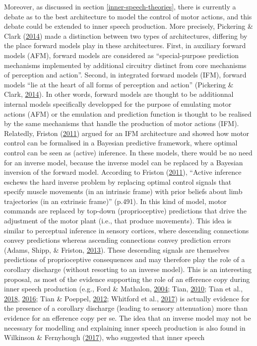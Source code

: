 \documentclass[a4paper,12pt,twoside,onecolumn,openright,final,oldfontcommands]{memoir}
\begin{document}
Moreover, as discussed in section \ref{inner-speech-theories}, there is currently a debate as to the best architecture to model the control of motor actions, and this debate could be extended to inner speech production. More precisely, Pickering \& Clark (\protect\hyperlink{ref-pickering_getting_2014}{2014}) made a distinction between two types of architectures, differing by the place forward models play in these architectures. First, in auxiliary forward models (AFM), forward models are considered as \enquote{special-purpose prediction mechanisms implemented by additional circuitry distinct from core mechanisms of perception and action}. Second, in integrated forward models (IFM), forward models \enquote{lie at the heart of all forms of perception and action} (Pickering \& Clark, \protect\hyperlink{ref-pickering_getting_2014}{2014}). In other words, forward models are thought to be additionnal internal models specifically developped for the purpose of emulating motor actions (AFM) or the emulation and prediction function is thought to be realised by the same mechanisms that handle the production of motor actions (IFM). Relatedly, Friston (\protect\hyperlink{ref-friston_what_2011}{2011}) argued for an IFM architecture and showed how motor control can be formalised in a Bayesian predictive framework, where optimal control can be seen as (active) inference. In these models, there would be no need for an inverse model, because the inverse model can be replaced by a Bayesian inversion of the forward model. According to Friston (\protect\hyperlink{ref-friston_what_2011}{2011}), \enquote{Active inference eschews the hard inverse problem by replacing optimal control signals that specify muscle movements (in an intrinsic frame) with prior beliefs about limb trajectories (in an extrinsic frame)} (p.491). In this kind of model, motor commands are replaced by top-down (proprioceptive) predictions that drive the adjustment of the motor plant (i.e., that produce movements). This idea is similar to perceptual inference in sensory cortices, where descending connections convey predictions whereas ascending connections convey prediction errors (Adams, Shipp, \& Friston, \protect\hyperlink{ref-adams_predictions_2013}{2013}). These descending signals are themselves predictions of proprioceptive consequences and may therefore play the role of a corollary discharge (without resorting to an inverse model). This is an interesting proposal, as most of the evidence supporting the role of an efference copy during inner speech production (e.g., Ford \& Mathalon, \protect\hyperlink{ref-ford_electrophysiological_2004}{2004}; Tian, \protect\hyperlink{ref-tian_mental_2010}{2010}; Tian et al., \protect\hyperlink{ref-tian_imagined_2018}{2018}, \protect\hyperlink{ref-tian_mental_2016}{2016}; Tian \& Poeppel, \protect\hyperlink{ref-tian_mental_2012}{2012}; Whitford et al., \protect\hyperlink{ref-whitford_neurophysiological_2017}{2017}) is actually evidence for the presence of a corollary discharge (leading to sensory attenuation) more than evidence for an efference copy per se. The idea that an inverse model may not be necessary for modelling and explaining inner speech production is also found in Wilkinson \& Fernyhough (\protect\hyperlink{ref-wilkinson_auditory_2017}{2017}), who suggested that inner speech 
\end{document}
